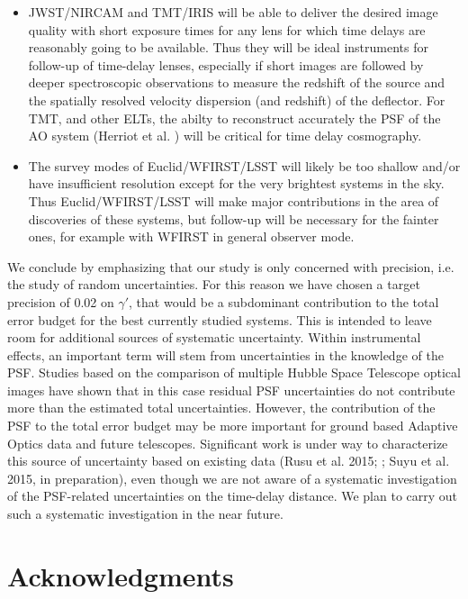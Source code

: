 \documentclass[a4paper,11pt]{article}
\begin{document}
{\begin{itemize}
\item JWST/NIRCAM and TMT/IRIS will be able to deliver the desired
image quality with short exposure times for any lens for which time
delays are reasonably going to be available. Thus they will be ideal
instruments for follow-up of time-delay lenses, especially if short
images are followed by deeper spectroscopic observations to measure
the redshift of the source and the spatially resolved velocity
dispersion (and redshift) of the deflector. For TMT, and other ELTs,
the abilty to reconstruct accurately the PSF of the AO system (Herriot
et al. \cite{2014SPIE.9148E..10H}) will be critical for time delay
cosmography.

\item The survey modes of Euclid/WFIRST/LSST will likely be too
shallow and/or have insufficient resolution except for the very
brightest systems in the sky. Thus Euclid/WFIRST/LSST will make major
contributions in the area of discoveries of these systems, but follow-up
will be necessary for the fainter ones, for example with WFIRST in
general observer mode.

\end{itemize}

We conclude by emphasizing that our study is only concerned with
precision, i.e. the study of random uncertainties. For this reason we
have chosen a target precision of 0.02 on $\gamma'$, that would be a
subdominant contribution to the total error budget for the best
currently studied systems. This is intended to leave room for
additional sources of systematic uncertainty. Within instrumental
effects, an important term will stem from uncertainties in the
knowledge of the PSF. Studies based on the comparison of multiple
Hubble Space Telescope optical images have shown that in this case
residual PSF uncertainties do not contribute more than the estimated
total uncertainties. However, the contribution of the PSF to the total
error budget may be more important for ground based Adaptive Optics
data and future telescopes. Significant work is under way to
characterize this source of uncertainty based on existing data (Rusu
et al. 2015; \cite{2015arXiv150605147R}; Suyu et al. 2015, in
preparation), even though we are not aware of a systematic
investigation of the PSF-related uncertainties on the time-delay
distance. We plan to carry out such a systematic investigation in the
near future.

\section*{Acknowledgments}

}
\end{document}

